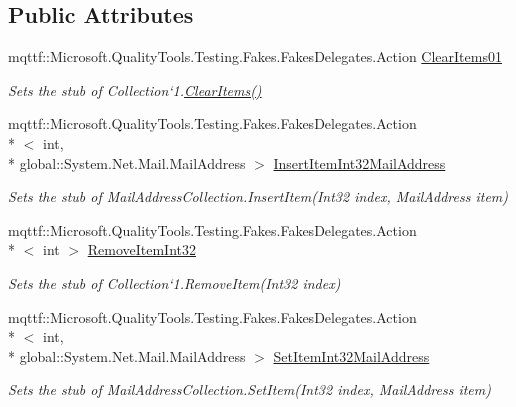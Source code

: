 \subsection*{Public Attributes}
\begin{DoxyCompactItemize}
\item 
mqttf\-::\-Microsoft.\-Quality\-Tools.\-Testing.\-Fakes.\-Fakes\-Delegates.\-Action \hyperlink{class_system_1_1_net_1_1_mail_1_1_fakes_1_1_stub_mail_address_collection_ad5e2ac22278dbafcfa2fb6dd5e45eba0}{Clear\-Items01}
\begin{DoxyCompactList}\small\item\em Sets the stub of Collection`1.\hyperlink{class_system_1_1_net_1_1_mail_1_1_fakes_1_1_stub_mail_address_collection_a3b0b325b989652f4c5ca9e7aa23e716f}{Clear\-Items()}\end{DoxyCompactList}\item 
mqttf\-::\-Microsoft.\-Quality\-Tools.\-Testing.\-Fakes.\-Fakes\-Delegates.\-Action\\*
$<$ int, \\*
global\-::\-System.\-Net.\-Mail.\-Mail\-Address $>$ \hyperlink{class_system_1_1_net_1_1_mail_1_1_fakes_1_1_stub_mail_address_collection_a7514722d215a27d3bbe5ca1784062686}{Insert\-Item\-Int32\-Mail\-Address}
\begin{DoxyCompactList}\small\item\em Sets the stub of Mail\-Address\-Collection.\-Insert\-Item(\-Int32 index, Mail\-Address item)\end{DoxyCompactList}\item 
mqttf\-::\-Microsoft.\-Quality\-Tools.\-Testing.\-Fakes.\-Fakes\-Delegates.\-Action\\*
$<$ int $>$ \hyperlink{class_system_1_1_net_1_1_mail_1_1_fakes_1_1_stub_mail_address_collection_adeb0e6eedb7affe8eac2330f23a763bc}{Remove\-Item\-Int32}
\begin{DoxyCompactList}\small\item\em Sets the stub of Collection`1.Remove\-Item(\-Int32 index)\end{DoxyCompactList}\item 
mqttf\-::\-Microsoft.\-Quality\-Tools.\-Testing.\-Fakes.\-Fakes\-Delegates.\-Action\\*
$<$ int, \\*
global\-::\-System.\-Net.\-Mail.\-Mail\-Address $>$ \hyperlink{class_system_1_1_net_1_1_mail_1_1_fakes_1_1_stub_mail_address_collection_a53e0e5e959b6e4d0ec72f97f8a484e3e}{Set\-Item\-Int32\-Mail\-Address}
\begin{DoxyCompactList}\small\item\em Sets the stub of Mail\-Address\-Collection.\-Set\-Item(\-Int32 index, Mail\-Address item)\end{DoxyCompactList}\item 

\end{DoxyCompactItemize}
